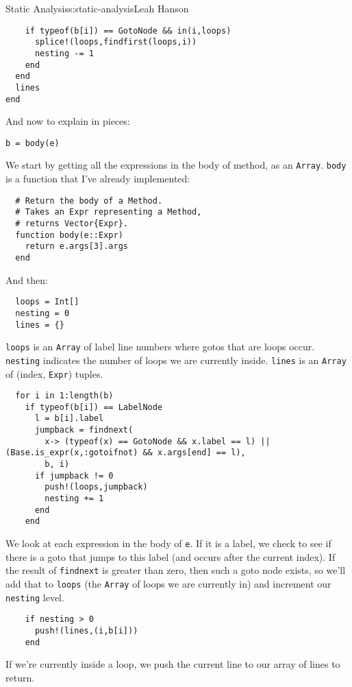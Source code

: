 \begin{aosachapter}{Static Analysis}{s:static-analysis}{Leah Hanson}
\begin{verbatim}
    if typeof(b[i]) == GotoNode && in(i,loops)
      splice!(loops,findfirst(loops,i))
      nesting -= 1
    end
  end
  lines
end
\end{verbatim}

And now to explain in pieces:

\begin{verbatim}
b = body(e)
\end{verbatim}

We start by getting all the expressions in the body of method, as an
\texttt{Array}. \texttt{body} is a function that I've already
implemented:

\begin{verbatim}
  # Return the body of a Method.
  # Takes an Expr representing a Method,
  # returns Vector{Expr}.
  function body(e::Expr)
    return e.args[3].args
  end
\end{verbatim}

And then:

\begin{verbatim}
  loops = Int[]
  nesting = 0
  lines = {}
\end{verbatim}

\texttt{loops} is an \texttt{Array} of label line numbers where gotos
that are loops occur. \texttt{nesting} indicates the number of loops we
are currently inside. \texttt{lines} is an \texttt{Array} of (index,
\texttt{Expr}) tuples.

\begin{verbatim}
  for i in 1:length(b)
    if typeof(b[i]) == LabelNode
      l = b[i].label
      jumpback = findnext(
        x-> (typeof(x) == GotoNode && x.label == l) || (Base.is_expr(x,:gotoifnot) && x.args[end] == l),
        b, i)
      if jumpback != 0
        push!(loops,jumpback)
        nesting += 1
      end
    end
\end{verbatim}

We look at each expression in the body of \texttt{e}. If it is a label,
we check to see if there is a goto that jumps to this label (and occurs
after the current index). If the result of \texttt{findnext} is greater
than zero, then such a goto node exists, so we'll add that to
\texttt{loops} (the \texttt{Array} of loops we are currently in) and
increment our \texttt{nesting} level.

\begin{verbatim}
    if nesting > 0
      push!(lines,(i,b[i]))
    end
\end{verbatim}

If we're currently inside a loop, we push the current line to our array
of lines to return.


\end{aosachapter}
